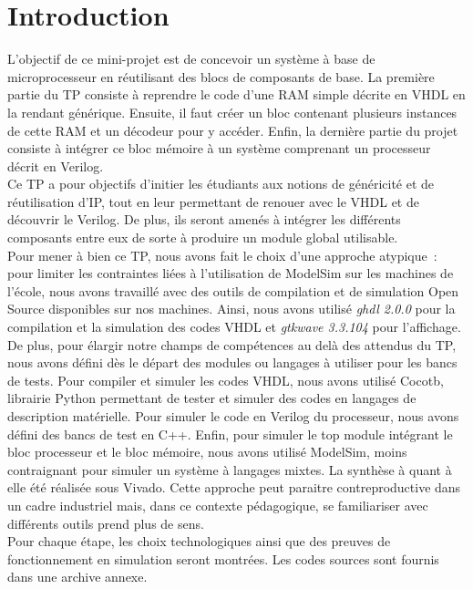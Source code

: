 \section{Introduction}


\indent L'objectif de ce mini-projet est de concevoir un système à base de microprocesseur en réutilisant des blocs de composants de base. La première partie du TP consiste à reprendre le code d'une RAM simple décrite en VHDL en la rendant générique. Ensuite, il faut créer un bloc contenant plusieurs instances de cette RAM et un décodeur pour y accéder. Enfin, la dernière partie du projet consiste à intégrer ce bloc mémoire à un système comprenant un processeur décrit en Verilog. \\
\indent Ce TP a pour objectifs d'initier les étudiants aux notions de généricité et de réutilisation d'\gls{IP}, tout en leur permettant de renouer avec le VHDL et de découvrir le Verilog. De plus, ils seront amenés à intégrer les différents composants entre eux de sorte à produire un module global utilisable. \\
\indent Pour mener à bien ce TP, nous avons fait le choix d'une approche atypique : pour limiter les contraintes liées à l'utilisation de ModelSim sur les machines de l'école, nous avons travaillé avec des outils de compilation et de simulation Open Source disponibles sur nos machines. Ainsi, nous avons utilisé \textit{ghdl 2.0.0} pour la compilation et la simulation des codes VHDL et \textit{gtkwave 3.3.104} pour l'affichage. De plus, pour élargir notre champs de compétences au delà des attendus du TP, nous avons défini dès le départ des modules ou langages à utiliser pour les bancs de tests. Pour compiler et simuler les codes VHDL, nous avons utilisé Cocotb, librairie Python permettant de tester et simuler des codes en langages de description matérielle. Pour simuler le code en Verilog du processeur, nous avons défini des bancs de test en C++. Enfin, pour simuler le top module intégrant le bloc processeur et le bloc mémoire, nous avons utilisé ModelSim, moins contraignant pour simuler un système à langages mixtes. La synthèse à quant à elle été réalisée sous Vivado. Cette approche peut paraitre contreproductive dans un cadre industriel mais, dans ce contexte pédagogique, se familiariser avec différents outils prend plus de sens. \\
\indent Pour chaque étape, les choix technologiques ainsi que des preuves de fonctionnement en simulation seront montrées. Les codes sources sont fournis dans une archive annexe.



